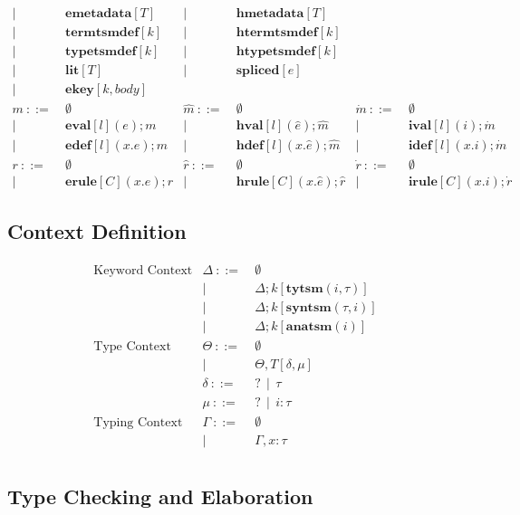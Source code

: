 \documentclass[letterpaper, notitlepage]{article}
\newcommand{\flyingbox}[1]{\begin{flushleft}\fbox{{#1}}\end{flushleft}}
\begin{document}
\[\begin{array}{rlrlrl}
				| ~ &~ \mathbf{emetadata}[T]     		& 		 	| ~ &~	\mathbf{hmetadata}[T]\\
				| ~ &~ \mathbf{termtsmdef}[k]     		&			| ~ &~ 	\mathbf{htermtsmdef}[k]\\
				| ~ &~ \mathbf{typetsmdef}[k]			& 			| ~ &~ 	\mathbf{htypetsmdef}[k]\\
				| ~ &~ \mathbf{lit}[T]					& 		 	| ~ &~ 	\mathbf{spliced}[e]\\
				| ~ &~ \mathbf{ekey}[k,body]\\
	m 			~::=&~ \emptyset						&\hat{m}	~::=&~ \emptyset								&\dot{m}	~::=&~ \emptyset\\
				| ~ &~ \mathbf{eval}[l](e);m 			&			| ~ &~ \mathbf{hval}[l](\hat{e});\hat{m} 		&			| ~ &~ \mathbf{ival}[l](i);\dot{m}\\
				| ~ &~ \mathbf{edef}[l](x.e);m 			&			| ~ &~ \mathbf{hdef}[l](x.\hat{e});\hat{m}		&			| ~ &~ \mathbf{idef}[l](x.i);\dot{m}\\
	r 			~::=&~ \emptyset 						&\hat{r} 	~::=&~ \emptyset 								&\dot{r} 	~::=&~ \emptyset\\
				| ~ &~ \mathbf{erule}[C](x.e);r 		& 			| ~ &~ \mathbf{hrule}[C](x.\hat{e});\hat{r} 	&			| ~ &~ \mathbf{irule}[C](x.i);\dot{r}
\end{array}
\]
\subsection{Context Definition}
\[
\begin{array}{rrl}
\text{Keyword Context}	&	\Delta 	~::=&~ 	\emptyset\\
						&			| ~ &~ 	\Delta;k[\mathbf{tytsm}(i,\tau)]\\
						&			| ~ &~ 	\Delta;k[\mathbf{syntsm}(\tau,i)]\\
						&			| ~ &~ 	\Delta;k[\mathbf{anatsm}(i)]\\
\text{Type Context}		&	\Theta 	~::=&~ \emptyset\\
						&			| ~ &~ \Theta,T[\delta,\mu] \\
						&	\delta 	~::=&~ ? ~~ | ~~ \tau\\
						&	\mu	   	~::=&~ ? ~~ | ~~ i:\tau\\
\text{Typing Context}	&	\Gamma 	~::=&~ \emptyset\\
						&			| ~ &~ \Gamma,x:\tau\\
\end{array}
\]

\subsection{Type Checking and Elaboration}
\flyingbox{$\rho \sim (\Theta;\Delta)\rightsquigarrow i:\tau$}
\begin{center}
      
\DP
\end{center}
\end{document}
